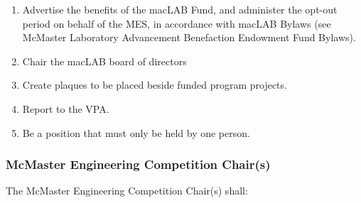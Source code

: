 \begin{enumerate}
 \item
  Advertise the benefits of the macLAB Fund, and administer the opt-out period on behalf of the MES, in accordance with macLAB Bylaws (see McMaster Laboratory Advancement Benefaction Endowment Fund Bylaws).
 \item
  Chair the macLAB board of directors
 \item
  Create plaques to be placed beside funded program projects.
 \item
  Report to the VPA.
 \item
  Be a position that must only be held by one person.

\end{enumerate}

\subsubsection{McMaster Engineering Competition Chair(s)}
\label{mcmaster-engineering-competition-chairs}
The McMaster Engineering Competition Chair(s) shall:

